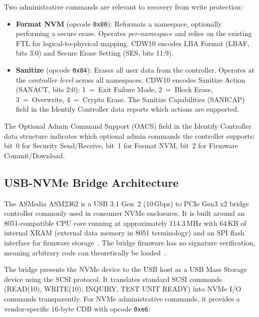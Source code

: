 \documentclass[conference]{IEEEtran}
\begin{document}
Two administrative commands are relevant to recovery from write
protection:
\begin{itemize}
\item \textbf{Format NVM} (opcode \texttt{0x80}): Reformats a
  namespace, optionally performing a secure erase. Operates
  \emph{per-namespace} and relies on the existing FTL for logical-to-physical
  mapping. CDW10 encodes LBA Format (LBAF, bits 3:0) and Secure Erase
  Setting (SES, bits 11:9).
\item \textbf{Sanitize} (opcode \texttt{0x84}): Erases all user data
  from the controller. Operates at the \emph{controller level} across
  all namespaces. CDW10 encodes Sanitize Action (SANACT, bits 2:0):
  1~=~Exit Failure Mode, 2~=~Block Erase, 3~=~Overwrite, 4~=~Crypto
  Erase. The Sanitize Capabilities (SANICAP) field in the Identify
  Controller data reports which actions are supported.
\end{itemize}

The Optional Admin Command Support (OACS) field in the Identify
Controller data structure indicates which optional admin commands the
controller supports: bit~0 for Security Send/Receive, bit~1 for Format
NVM, bit~2 for Firmware Commit/Download.


\subsection{USB-NVMe Bridge Architecture}
\label{sec:bridge-arch}

The ASMedia ASM2362 is a USB 3.1 Gen~2 (10\,Gbps) to PCIe Gen3 x2
bridge controller commonly used in consumer NVMe enclosures. It is built
around an 8051-compatible CPU core running at approximately 114.3\,MHz
with 64\,KB of internal XRAM (external data memory in 8051 terminology)
and an SPI flash interface for firmware storage~\cite{cyrozap-usb-pcie}.
The bridge firmware has no signature verification, meaning arbitrary
code can theoretically be loaded~\cite{cyrozap-usb-pcie}.

The bridge presents the NVMe device to the USB host as a USB Mass
Storage device using the SCSI protocol. It translates standard SCSI
commands (READ(10), WRITE(10), INQUIRY, TEST UNIT READY) into NVMe I/O
commands transparently. For NVMe administrative commands, it provides a
vendor-specific 16-byte CDB with opcode \texttt{0xe6}:
\end{document}
